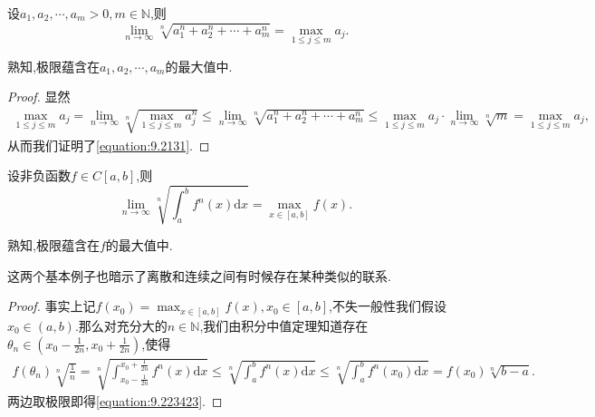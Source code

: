 \documentclass[../../main.tex]{subfiles}%
\begin{document}
\begin{example}
设\(a_1,a_2,\cdots,a_m > 0,m \in \mathbb{N}\),则
\[
\lim_{n \to \infty} \sqrt[n]{a_1^n + a_2^n + \cdots + a_m^n} = \max_{1\leqslant  j\leqslant  m} a_j.
\]
\end{example} 
\begin{remark}
熟知,极限蕴含在\(a_1,a_2,\cdots,a_m\)的最大值中.
\end{remark}
\begin{proof}

显然
\begin{align}\label{equation:9.2131}
\max_{1\leqslant  j\leqslant  m} a_j = \lim_{n \to \infty} \sqrt[n]{\max_{1\leqslant  j\leqslant  m} a_j^n} \leqslant  \lim_{n \to \infty} \sqrt[n]{a_1^n + a_2^n + \cdots + a_m^n} \leqslant  \max_{1\leqslant  j\leqslant  m} a_j \cdot \lim_{n \to \infty} \sqrt[n]{m} = \max_{1\leqslant  j\leqslant  m} a_j,
\end{align}
从而我们证明了\eqref{equation:9.2131}.  

\end{proof}

\begin{example}\label{example-3.31}
设非负函数\(f \in C[a,b]\),则
\[
\lim_{n \to \infty} \sqrt[n]{\int_{a}^{b} f^n(x)\mathrm{d}x} = \max_{x\in[a,b]} f(x).
\]
\end{example}
\begin{remark}
熟知,极限蕴含在\(f\)的最大值中. 
\end{remark}
\begin{note}
这两个基本例子也暗示了离散和连续之间有时候存在某种类似的联系.
\end{note}
\begin{proof}

事实上记\(f(x_0) = \max_{x\in[a,b]} f(x), x_0 \in [a,b]\),不失一般性我们假设\(x_0 \in (a,b)\).那么对充分大的\(n \in \mathbb{N}\),我们由积分中值定理知道存在\(\theta_n \in (x_0 - \frac{1}{2n}, x_0 + \frac{1}{2n})\),使得
\begin{align}\label{equation:9.223423}
f(\theta_n) \sqrt[n]{\frac{1}{n}} = \sqrt[n]{\int_{x_0 - \frac{1}{2n}}^{x_0 + \frac{1}{2n}} f^n(x)\mathrm{d}x} \leqslant  \sqrt[n]{\int_{a}^{b} f^n(x)\mathrm{d}x} \leqslant  \sqrt[n]{\int_{a}^{b} f^n(x_0)\mathrm{d}x} = f(x_0) \sqrt[n]{b - a}.   
\end{align}
两边取极限即得\eqref{equation:9.223423}.

\end{proof}
\end{document}
